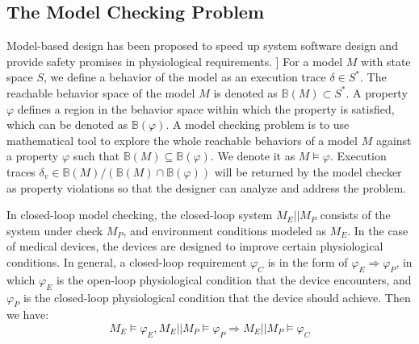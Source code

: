 \subsection{The Model Checking Problem}
Model-based design has been proposed to speed up system software design and provide safety promises in physiological requirements. ]
For a model $M$ with state space $S$, we define a behavior of the model as an execution trace $\delta\in S^*$. The reachable behavior space of the model $M$ is denoted as $\mathbb{B}(M)\subset S^*$. A property $\varphi$ defines a region in the behavior space within which the property is satisfied, which can be denoted as $\mathbb{B}(\varphi)$. A model checking problem is to use mathematical tool to explore the whole reachable behaviors of a model $M$ against a property $\varphi$ such that $\mathbb{B}(M)\subseteq \mathbb{B}(\varphi)$. We denote it as $M\models\varphi$. Execution traces $\delta_v\in\mathbb{B}(M)/(\mathbb{B}(M)\cap\mathbb{B}(\varphi))$ will be returned by the model checker as property violations so that the designer can analyze and address the problem. 

In closed-loop model checking, the closed-loop system $M_E||M_P$ consists of the system under check $M_P$, and environment conditions modeled as $M_E$. In the case of medical devices, the devices are designed to improve certain physiological conditions. In general, a closed-loop requirement $\varphi_C$ is in the form of $\varphi_E\Rightarrow \varphi_P$, in which $\varphi_E$ is the open-loop physiological condition that the device encounters, and $\varphi_P$ is the closed-loop physiological condition that the device should achieve. Then we have:
 \begin{equation}\label{req_def}
M_E\models\varphi_E, M_E||M_P\models \varphi_P\Rightarrow M_E||M_P\models\varphi_C
\end{equation}

